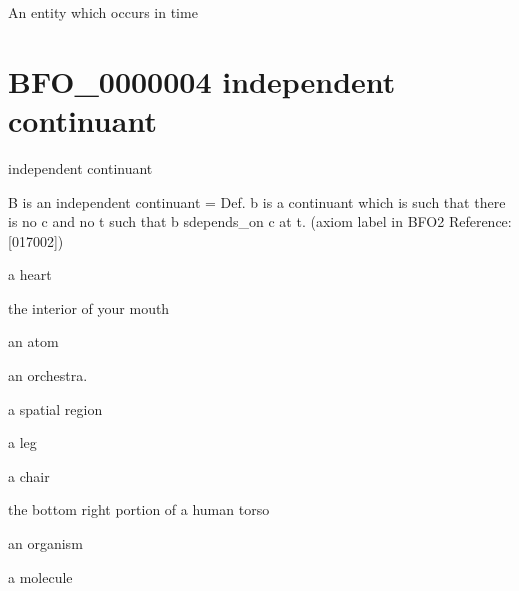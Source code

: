\documentclass[letterpaper,10pt,english]{sphinxmanual}
\begin{document}
\begin{sphinxShadowBox}

\sphinxAtStartPar
An entity which occurs in time
\end{sphinxShadowBox}

\begin{sphinxShadowBox}

\sphinxAtStartPar
{}
\end{sphinxShadowBox}
\begin{quote}
\label{\detokenize{doc-BFO_0000004:bfo-0000004}}\label{\detokenize{doc-BFO_0000004:independent-continuant}}\label{\detokenize{doc-BFO_0000004:bfo-0000004}}
\ignorespaces \end{quote}


\section{BFO\_0000004 \sphinxhyphen{} independent continuant}
\label{\detokenize{doc-BFO_0000004:bfo-0000004-independent-continuant}}\label{\detokenize{doc-BFO_0000004:index-0}}\label{\detokenize{doc-BFO_0000004::doc}}
\begin{sphinxShadowBox}

\sphinxAtStartPar
independent continuant
\end{sphinxShadowBox}

\begin{sphinxShadowBox}

\sphinxAtStartPar
B is an independent continuant = Def. b is a continuant which is such that there is no c and no t such that b s\sphinxhyphen{}depends\_on c at t. (axiom label in BFO2 Reference: {[}017\sphinxhyphen{}002{]})
\end{sphinxShadowBox}

\begin{sphinxShadowBox}

\sphinxAtStartPar
a heart

\sphinxAtStartPar
the interior of your mouth

\sphinxAtStartPar
an atom

\sphinxAtStartPar
an orchestra.

\sphinxAtStartPar
a spatial region

\sphinxAtStartPar
a leg

\sphinxAtStartPar
a chair

\sphinxAtStartPar
the bottom right portion of a human torso

\sphinxAtStartPar
an organism

\sphinxAtStartPar
a molecule
\end{sphinxShadowBox}
\end{document}
